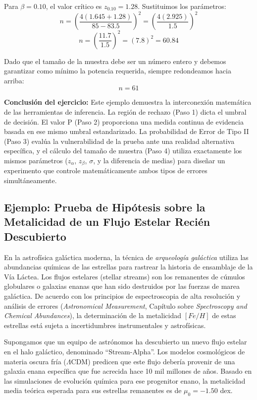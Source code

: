 Para $\beta = 0.10$, el valor crítico es $z_{0.10} = 1.28$. Sustituimos los parámetros:
$$ n = \left( \frac{4 (1.645 + 1.28)}{85 - 83.5} \right)^2 = \left( \frac{4 (2.925)}{1.5} \right)^2 $$
$$ n = \left( \frac{11.7}{1.5} \right)^2 = (7.8)^2 = 60.84 $$

Dado que el tamaño de la muestra debe ser un número entero y debemos garantizar como mínimo la potencia requerida, siempre redondeamos hacia arriba:
$$ n = 61 $$

\textbf{Conclusión del ejercicio:}
Este ejemplo demuestra la interconexión matemática de las herramientas de inferencia. La región de rechazo (Paso 1) dicta el umbral de decisión. El valor P (Paso 2) proporciona una medida continua de evidencia basada en ese mismo umbral estandarizado. La probabilidad de Error de Tipo II (Paso 3) evalúa la vulnerabilidad de la prueba ante una realidad alternativa específica, y el cálculo del tamaño de muestra (Paso 4) utiliza exactamente los mismos parámetros ($z_{\alpha}$, $z_{\beta}$, $\sigma$, y la diferencia de medias) para diseñar un experimento que controle matemáticamente ambos tipos de errores simultáneamente.

\subsection{Ejemplo: Prueba de Hipótesis sobre la Metalicidad de un Flujo Estelar Recién Descubierto}

En la astrofísica galáctica moderna, la técnica de \textit{arqueología galáctica} utiliza las abundancias químicas de las estrellas para rastrear la historia de ensamblaje de la Vía Láctea. Los flujos estelares (stellar streams) son los remanentes de cúmulos globulares o galaxias enanas que han sido destruidos por las fuerzas de marea galáctica. De acuerdo con los principios de espectroscopia de alta resolución y análisis de errores (\textit{Astronomical Measurement}, Capítulo sobre \textit{Spectroscopy and Chemical Abundances}), la determinación de la metalicidad $[Fe/H]$ de estas estrellas está sujeta a incertidumbres instrumentales y astrofísicas.

Supongamos que un equipo de astrónomos ha descubierto un nuevo flujo estelar en el halo galáctico, denominado ``Stream-Alpha''. Los modelos cosmológicos de materia oscura fría ($\Lambda$CDM) predicen que este flujo debería provenir de una galaxia enana específica que fue acrecida hace 10 mil millones de años. Basado en las simulaciones de evolución química para ese progenitor enano, la metalicidad media teórica esperada para sus estrellas remanentes es de $\mu_0 = -1.50$ dex.


